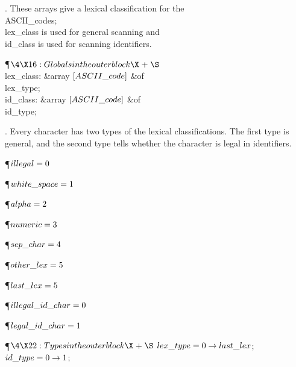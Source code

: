 .
These arrays give a lexical classification for the \\{ASCII\_code}s;
\\{lex\_class} is used for general scanning and \\{id\_class} is used for
scanning identifiers.

\Y\P$\4\X16:Globals in the outer block\X\mathrel{+}\S$\6
\4\\{lex\_class}: \&{array} $[\\{ASCII\_code}]$ \1\&{of}\5
\\{lex\_type};\2\6
\4\\{id\_class}: \&{array} $[\\{ASCII\_code}]$ \1\&{of}\5
\\{id\_type};\2\par
\fi

.
Every character has two types of the lexical classifications.  The
first type is general, and the second type tells whether the character
is legal in identifiers.

\Y\P\D {}$\\{illegal}=0$\par
\P\D {}$\\{white\_space}=1$\par
\P\D {}$\\{alpha}=2$\par
\P\D {}$\\{numeric}=3$\par
\P\D {}$\\{sep\_char}=4$\par
\P\D {}$\\{other\_lex}=5$\par
\P\D {}$\\{last\_lex}=5$\Y\par
\P\D {}$\\{illegal\_id\_char}=0$\par
\P\D {}$\\{legal\_id\_char}=1$\par
\Y\P$\4\X22:Types in the outer block\X\mathrel{+}\S$\6
$\\{lex\_type}=0\to\\{last\_lex}$;\6
$\\{id\_type}=0\to1$;\par
\fi

